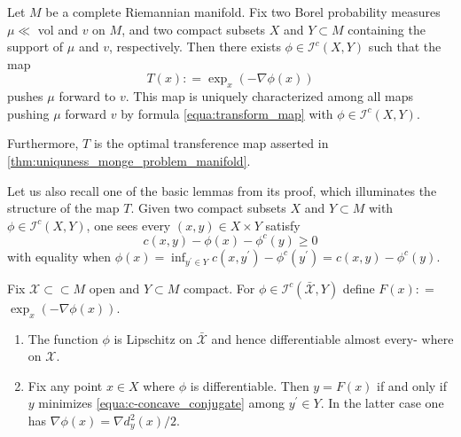 \begin{thm}
	\label{thm:optimal_transport_manifold}
	Let \( M \) be a complete Riemannian manifold.
	Fix two Borel probability measures \( \mu \ll \) vol and \( v \) on \( M \),
	and two compact subsets \( X \) and \( Y \subset M \) containing the support of \( \mu \) and \( v \),
	respectively.
	Then there exists \( \phi \in \mathcal { I } ^ { c } ( X , Y ) \) such that the map
	\begin{equation}
		\label{equa:transform_map}
		T ( x ) : = \exp _ { x } ( - \nabla \phi ( x ) )
	\end{equation}
	pushes \( \mu \) forward to \( v \).
	This map is uniquely characterized among all maps pushing \( \mu \) forward \( v \) by formula \cref{equa:transform_map} with \( \phi \in \mathcal{I} ^ { c } ( X , Y )\).

	Furthermore, $T$ is the optimal transference map asserted in \cref{thm:uniquness_monge_problem_manifold}.
\end{thm}

Let us also recall one of the basic lemmas from its proof,
which illuminates the structure of the map \( T \).
Given two compact subsets \( X \) and \( Y \subset M \) with \( \phi \in \mathcal { I } ^ { c } ( X , Y ) \),
one sees every \( ( x , y ) \in X \times Y \) satisfy
\begin{equation}
	\label{equa:c-concave_conjugate}
	c ( x , y ) - \phi ( x ) - \phi ^ { c } ( y ) \geq 0
\end{equation}
with equality when \( \phi ( x ) = \inf _ { y ^ { \prime } \in Y } c \left( x , y ^ { \prime } \right) - \phi ^ { c } \left( y ^ { \prime } \right) = c ( x , y ) - \phi ^ { c } ( y ) . \)

\begin{lem}
	\label{lem:minimizer_differentiable}
	Fix \( \mathcal{X} \subset \subset M \) open and \( Y \subset M \) compact.
	For \( \phi \in \mathcal{I} ^ { c } ( \bar { \mathcal{X} } , Y ) \) define \( F ( x ) : = \)
	\( \exp _ { x } ( - \nabla \phi ( x ) ) \).
	\begin{enumerate}
		\item The function \( \phi \) is Lipschitz on \( \bar { \mathcal{X} } \) and hence differentiable almost every-
		      where on \( \mathcal{X} \).
		\item Fix any point \( x \in X \) where \( \phi \) is differentiable. Then \( y = F ( x ) \) if and
		      only if \( y \) minimizes \cref{equa:c-concave_conjugate} among \( y ^ { \prime } \in Y . \) In the latter case one has
		      \( \nabla \phi ( x ) = \nabla d _ { y } ^ { 2 } ( x ) / 2 \).
	\end{enumerate}
\end{lem}

